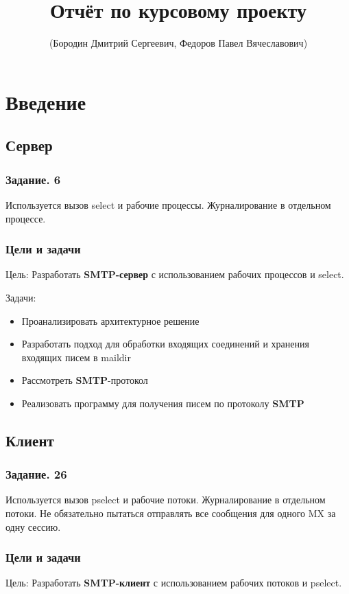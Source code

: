 \documentclass[a4paper,12pt]{report}
\title{Отчёт по курсовому проекту}
\author{(Бородин Дмитрий Сергеевич, Федоров Павел Вячеславович)}
\begin{document}
\maketitle

\tableofcontents

\chapter*{Введение}

\section*{Сервер}

\subsection*{Задание. 6}
Используется вызов select и рабочие процессы. Журналирование в отдельном процессе.
\subsection*{Цели и задачи}
Цель: 
    Разработать \textbf{SMTP-сервер} с использованием рабочих процессов и select.

Задачи:
\begin{itemize}
    \item Проанализировать архитектурное решение
    \item Разработать подход для обработки входящих соединений и хранения входящих писем в maildir
    \item Рассмотреть \textbf{SMTP}-протокол
    \item Реализовать программу для получения писем по протоколу \textbf{SMTP}
\end{itemize}

\section*{Клиент}

\subsection*{Задание. 26}
Используется вызов pselect и рабочие потоки. Журналирование в отдельном потоки. Не обязательно пытаться отправлять все сообщения для одного MX за одну сессию.
\subsection*{Цели и задачи}
Цель: 
    Разработать \textbf{SMTP-клиент} с использованием рабочих потоков и pselect.
\end{document}
